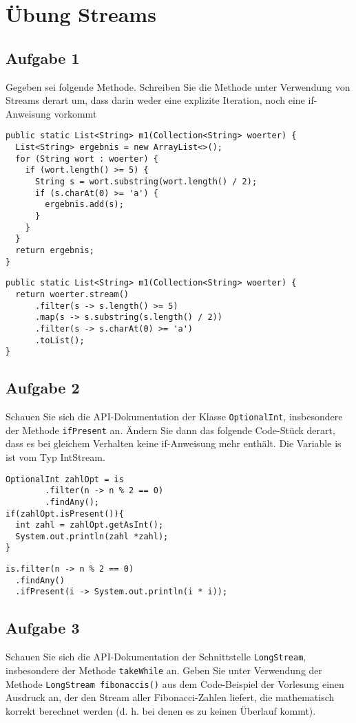 \chapter{Übung Streams}

\section{Aufgabe 1}
Gegeben sei folgende Methode. Schreiben Sie die Methode unter Verwendung von
Streams derart um, dass darin weder eine explizite Iteration, noch eine
if-Anweisung vorkommt

\begin{lstlisting}
public static List<String> m1(Collection<String> woerter) {
  List<String> ergebnis = new ArrayList<>();
  for (String wort : woerter) {
    if (wort.length() >= 5) {
      String s = wort.substring(wort.length() / 2);
      if (s.charAt(0) >= 'a') {
        ergebnis.add(s);
      }
    }
  }
  return ergebnis;
}
\end{lstlisting}

\begin{lstlisting}
public static List<String> m1(Collection<String> woerter) {
  return woerter.stream()
      .filter(s -> s.length() >= 5)
      .map(s -> s.substring(s.length() / 2))
      .filter(s -> s.charAt(0) >= 'a')
      .toList();
}
\end{lstlisting}

\section{Aufgabe 2}
Schauen Sie sich die API-Dokumentation der Klasse \lstinline{OptionalInt},
insbesondere der Methode \lstinline{ifPresent} an. Ändern Sie dann das folgende
Code-Stück derart, dass es bei gleichem Verhalten keine if-Anweisung mehr
enthält. Die Variable is ist vom Typ IntStream.

\begin{lstlisting}
OptionalInt zahlOpt = is
        .filter(n -> n % 2 == 0)
        .findAny();
if(zahlOpt.isPresent()){
  int zahl = zahlOpt.getAsInt();
  System.out.println(zahl *zahl);
}
\end{lstlisting}

\begin{lstlisting}
is.filter(n -> n % 2 == 0)
  .findAny()
  .ifPresent(i -> System.out.println(i * i));
\end{lstlisting}

\section{Aufgabe 3}
Schauen Sie sich die API-Dokumentation der Schnittstelle
\lstinline{LongStream}, insbesondere der Methode \lstinline{takeWhile} an.
Geben Sie unter Verwendung der Methode \lstinline{LongStream fibonaccis()} aus
dem Code-Beispiel der Vorlesung einen Ausdruck an, der den Stream aller
Fibonacci-Zahlen liefert, die mathematisch korrekt berechnet werden (d. h. bei
denen es zu keinen Überlauf kommt).

